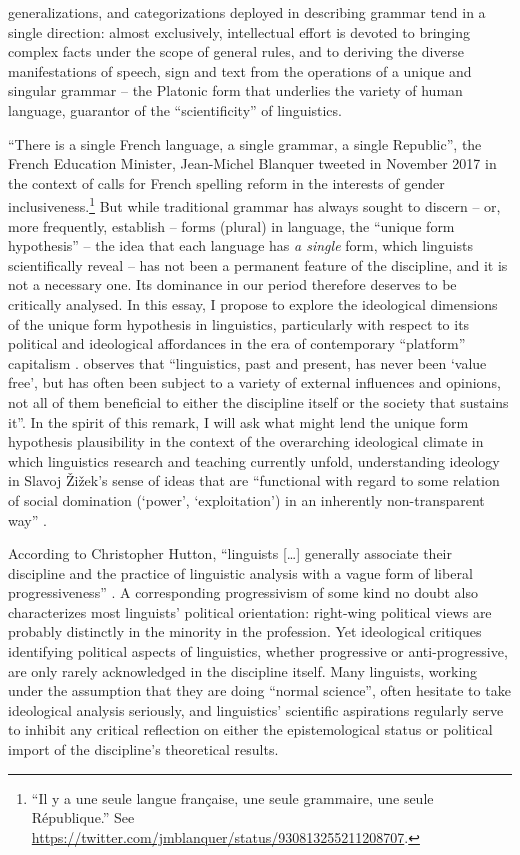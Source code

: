 \documentclass[output=paper]{langscibook}
\begin{document}
generalizations, and categorizations deployed in describing grammar tend in a single direction: almost exclusively, intellectual effort is devoted to bringing complex facts under the scope of general rules, and to deriving the diverse manifestations of speech, sign and text from the operations of a unique and singular grammar – the Platonic form that underlies the variety of human language, guarantor of the ``scientificity'' of linguistics.

``There is a single French language, a single grammar, a single Republic'', the French Education Minister, Jean-Michel Blanquer tweeted in November 2017 in the context of calls for French spelling reform in the interests of gender inclusiveness.\footnote{``Il y a une seule langue française, une seule grammaire, une seule République.'' See \url{https://twitter.com/jmblanquer/status/930813255211208707}.} But while traditional grammar has always sought to discern – or, more frequently, establish – forms (plural) in language, the ``unique form hypothesis'' – the idea that each language has \emph{a single} form, which linguists scientifically reveal – has not been a permanent feature of the discipline, and it is not a necessary one. Its dominance in our period therefore deserves to be critically analysed. In this essay, I propose to explore the ideological dimensions of the unique form hypothesis in linguistics, particularly with respect to its political and ideological affordances in the era of contemporary ``platform'' capitalism \citep{Srnicek2017}. \citet[19]{Koerner2000} observes that ``linguistics, past and present, has never been `value free', but has often been subject to a variety of external influences and opinions, not all of them beneficial to either the discipline itself or the society that sustains it''. In the spirit of this remark, I will ask what might lend the unique form hypothesis plausibility in the context of the overarching ideological climate in which linguistics research and teaching currently unfold, understanding ideology in Slavoj Žižek's sense of ideas that are ``functional with regard to some relation of social domination (`power', `exploitation') in an inherently non-transparent way'' \citep[8]{Zizek1994}.

According to Christopher Hutton, ``linguists […] generally associate their discipline and the practice of linguistic analysis with a vague form of liberal progressiveness'' \citep[295]{Hutton2001}. A corresponding progressivism of some kind no doubt also characterizes most linguists' political orientation: right-wing political views are probably distinctly in the minority in the profession. Yet ideological critiques identifying political aspects of linguistics, whether progressive or anti-progressive, are only rarely acknowledged in the discipline itself. Many linguists, working under the assumption that they are doing ``normal science'', often hesitate to take ideological analysis seriously, and linguistics' scientific aspirations regularly serve to inhibit any critical reflection on either the epistemological status or political import of the discipline's theoretical results.
\end{document}
